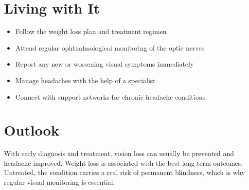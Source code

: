 \section{Living with It}
\begin{itemize}[noitemsep]
  \item Follow the weight loss plan and treatment regimen
  \item Attend regular ophthalmological monitoring of the optic nerves
  \item Report any new or worsening visual symptoms immediately
  \item Manage headaches with the help of a specialist
  \item Connect with support networks for chronic headache conditions
\end{itemize}
\section{Outlook}
With early diagnosis and treatment, vision loss can usually be prevented and headache improved. Weight loss is associated with the best long-term outcomes. Untreated, the condition carries a real risk of permanent blindness, which is why regular visual monitoring is essential.
